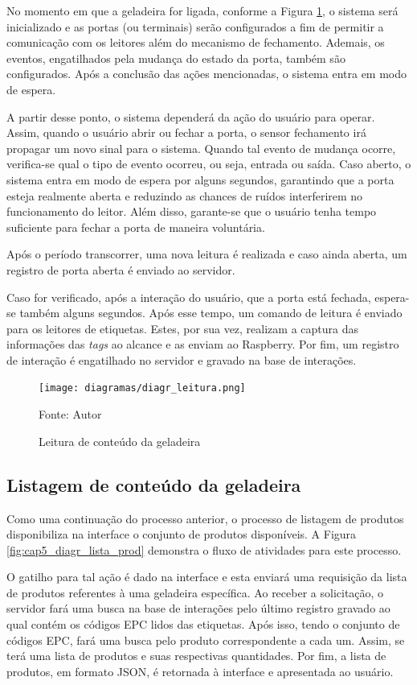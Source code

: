 No momento em que a geladeira for ligada, conforme a Figura \ref{fig:cap5_diagr_leitura}, o sistema será inicializado e as portas (ou terminais) serão configurados a fim de permitir a comunicação com os leitores além do mecanismo de fechamento. Ademais, os eventos, engatilhados pela mudança do estado da porta, também são configurados. Após a conclusão das ações mencionadas, o sistema entra em modo de espera.

A partir desse ponto, o sistema dependerá da ação do usuário para operar. Assim, quando o usuário abrir ou fechar a porta, o sensor fechamento irá propagar um novo sinal para o sistema. Quando tal evento de mudança ocorre, verifica-se qual o tipo de evento ocorreu, ou seja, entrada ou saída. Caso aberto, o sistema entra em modo de espera por alguns segundos, garantindo que a porta esteja realmente aberta e reduzindo as chances de ruídos interferirem no funcionamento do leitor. Além disso, garante-se que o usuário tenha tempo suficiente para fechar a porta de maneira voluntária. 

Após o período transcorrer, uma nova leitura é realizada e caso ainda aberta, um registro de porta aberta é enviado ao servidor. 

Caso for verificado, após a interação do usuário, que a porta está fechada, espera-se também alguns segundos. Após esse tempo, um comando de leitura é enviado para os leitores de etiquetas. Estes, por sua vez, realizam a captura das informações das \textit{tags} ao alcance e as enviam ao Raspberry. Por fim, um registro de interação é engatilhado no servidor e gravado na base de interações.

\begin{figure}[htb]
    \caption{Leitura de conteúdo da geladeira}
    \label{fig:cap5_diagr_leitura}
    \texttt{[image: diagramas/diagr\_leitura.png]}
    
    \footnotesize{Fonte: Autor}
\end{figure}

\subsection{Listagem de conteúdo da geladeira}

Como uma continuação do processo anterior, o processo de listagem de produtos disponibiliza na interface o conjunto de produtos disponíveis. A Figura \ref{fig:cap5_diagr_lista_prod} demonstra o fluxo de atividades para este processo.

O gatilho para tal ação é dado na interface e esta enviará uma requisição da lista de produtos referentes à uma geladeira específica. Ao receber a solicitação, o servidor fará uma busca na base de interações pelo último registro gravado ao qual contém os códigos EPC lidos das etiquetas. Após isso, tendo o conjunto de códigos EPC, fará uma busca pelo produto correspondente a cada um. Assim, se terá uma lista de produtos e suas respectivas quantidades. Por fim, a lista de produtos, em formato JSON, é retornada à interface e apresentada ao usuário.

